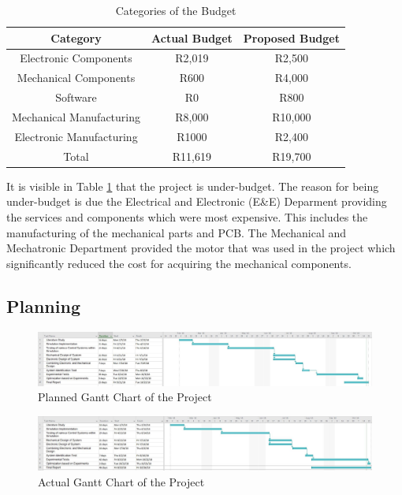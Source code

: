\begin{table}[h]
	\centering
	\begin{tabular}{|c|c|c|}
		\hline
		Category & Actual Budget & Proposed Budget \\
		\hline
		\hline
		Electronic Components & R2,019 & R2,500\\
		\hline
		Mechanical Components & R600 & R4,000\\
		\hline 
		Software & R0 & R800\\
		\hline
		Mechanical Manufacturing & R8,000 & R10,000\\
		\hline
		Electronic Manufacturing & R1000 & R2,400\\
		\hline
		\hline 
		Total & R11,619 & R19,700\\
		\hline
		
	\end{tabular}
	\caption{Categories of the Budget }
	\label{table:budget}
	
\end{table}

It is visible in Table \ref{table:budget} that the project is under-budget. The reason for being under-budget is due the Electrical and Electronic (E\&E) Deparment providing the services and components which were most expensive. This includes the manufacturing of the mechanical parts and PCB. The Mechanical and Mechatronic Department provided the motor that was used in the project which significantly reduced the cost for acquiring the mechanical components.


\subsection{Planning}

\begin{figure}[h]
	\centering
	\includegraphics[scale=0.35]{./figs/planning_gantt/planned_ganttchart.jpg}
	\caption{Planned Gantt Chart of the Project}
	\label{fig:planned_ganttchart}
\end{figure}

\begin{figure}[h]
	\centering
	\includegraphics[scale=0.35]{./figs/planning_gantt/actual_ganttchart.jpg}
	\caption{Actual Gantt Chart of the Project}
	\label{fig:actual_ganttchart}
\end{figure}

